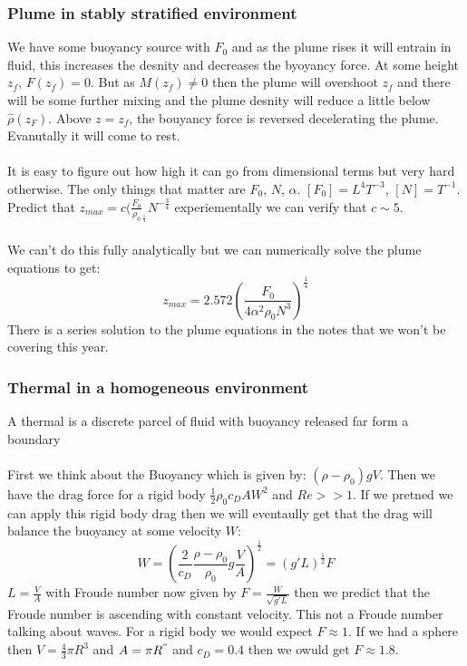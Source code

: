 \documentclass{article}
\begin{document}
                 \subsubsection{Plume in stably stratified environment}
                 We have some buoyancy source with $F_0$ and as the plume rises it will entrain in fluid, this increases the desnity and decreases the byoyancy force. At some height $z_f$, $F(z_f) = 0$. But as $M(z_f) \neq 0$ then the plume will overshoot $z_f$ and there will be some further mixing and the plume desnity will reduce a little below $\hat \rho ( z_F)$. Above $z=z_f$, the bouyancy force is reversed decelerating the plume. Evanutally it will come to rest. \\\\It is easy to figure out how high it can go from dimensional terms but very hard otherwise. The only things that matter are $F_0$, $N$, $\alpha$. $[ F_0] = L^4 T^{-3}$, $[N] = T^{-1}$. Predict that $z_{max} = c ( \frac{F_0}{\rho_0}_^{\frac{1}{4}} N^{- \frac{3}{4}}$ experiementally we can verify that $c \sim 5$.\\\\
                 We can't do this fully analytically but we can numerically solve the plume equations to get:
                 $$
                  z_{max} = 2.572 ( \frac{F_0}{4 \alpha^2 \rho_0 N^3})^{\frac{1}{4}}
                 $$
                 There is a series solution to the plume equations in the notes that we won't be covering this year.
                 \subsubsection{Thermal in a homogeneous environment}
                 A thermal is a discrete parcel of fluid with buoyancy released far form a boundary\\\\
                 First we think about the Buoyancy which is given by: $(\rho - \rho_0) g V$. Then we have the drag force for a rigid body $\frac{1}{2} \rho_0 c_D A W^2$ and $Re >>1$. If we pretned we can apply this rigid body drag then we will eventaully get that the drag will balance the buoyancy at some velocity $W$:
                 $$
                  W= ( \frac{2}{c_D} \frac{\rho- \rho_0}{\rho_0} g \frac{V}{A})^{\frac{1}{2}} = ( g' L)^{\frac{1}{2}} F
                 $$
                 $L = \frac{V}{A}$ with Froude number now given by $F = \frac{W}{\sqrt{g' L}}$ then we predict that the Froude number is ascending with constant velocity. This not a Froude number talking about waves. For a rigid body we would expect $F \approx 1$. If we had a sphere then $V = \frac{4}{3} \pi R^3$ and $A = \pi R^"$ and $c_D = 0.4$ then we owuld get $F \approx 1.8$.
\end{document}
